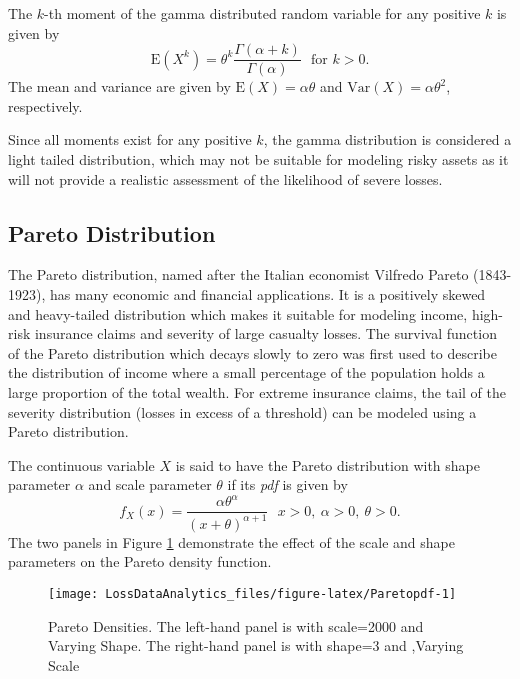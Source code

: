 \documentclass[]{book}
\theoremstyle{definition}
\theoremstyle{definition}
\theoremstyle{definition}
\theoremstyle{remark}
\begin{document}
The \(k\)-th moment of the gamma distributed random variable for any
positive \(k\) is given by
\[\mathrm{E}\left( X^{k} \right) = \theta^{k} \frac{\Gamma\left( \alpha + k \right)}{\Gamma\left( \alpha \right)}  \ \ \ \text{for } k > 0.\]
The mean and variance are given by
\(\mathrm{E}\left( X \right) = \alpha\theta\) and
\(\mathrm{Var}\left( X \right) = \alpha\theta^{2}\), respectively.

Since all moments exist for any positive \(k\), the gamma distribution
is considered a light tailed distribution, which may not be suitable for
modeling risky assets as it will not provide a realistic assessment of
the likelihood of severe losses.

\subsection{Pareto Distribution}\label{pareto-distribution}

The Pareto distribution, named after the Italian economist Vilfredo
Pareto (1843-1923), has many economic and financial applications. It is
a positively skewed and heavy-tailed distribution which makes it
suitable for modeling income, high-risk insurance claims and severity of
large casualty losses. The survival function of the Pareto distribution
which decays slowly to zero was first used to describe the distribution
of income where a small percentage of the population holds a large
proportion of the total wealth. For extreme insurance claims, the tail
of the severity distribution (losses in excess of a threshold) can be
modeled using a Pareto distribution.

The continuous variable \(X\) is said to have the Pareto distribution
with shape parameter \(\alpha\) and scale parameter \(\theta\) if its
\emph{pdf} is given by
\[f_{X}\left( x \right) = \frac{\alpha\theta^{\alpha}}{\left( x + \theta \right)^{\alpha + 1}} \ \ \  x  >  0,\ \alpha >  0,\ \theta > 0.\]
The two panels in Figure \ref{fig:Paretopdf} demonstrate the effect of
the scale and shape parameters on the Pareto density function.

\begin{figure}

{\centering \texttt{[image: LossDataAnalytics\_files/figure-latex/Paretopdf-1]} 

}

\caption{Pareto Densities. The left-hand panel is with scale=2000 and Varying Shape.  The right-hand panel is with shape=3 and ,Varying Scale}\label{fig:Paretopdf}
\end{figure}
\end{document}
